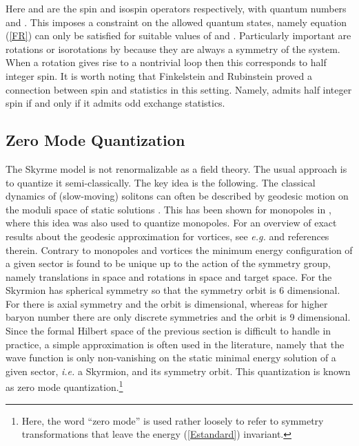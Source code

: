 \documentclass[a4paper,12pt]{article}
\begin{document}
%
Here \coordHE{} and \coordHE{} are the spin and isospin operators 
respectively, with quantum numbers \coordHE{} and \coordHE{}.
This imposes a constraint on the allowed quantum states, namely 
equation (\ref{FR}) can only be satisfied for suitable values of 
\coordHE{} and \coordHE{}. 
Particularly important are 
rotations or isorotations by \myHighlight{$2 \pi$}\coordHE{} because they are always a 
symmetry of the system. When a \myHighlight{$2 \pi$}\coordHE{} rotation gives rise to a 
nontrivial loop then this corresponds to half integer spin.
%
It is worth noting that Finkelstein and Rubinstein 
proved a connection between spin and statistics in this setting. 
Namely, \coordHE{} admits half integer spin if and only if it admits odd 
exchange statistics.

\subsection{Zero Mode Quantization}
\label{Zero-mode}


The Skyrme model is not renormalizable as a field theory. The usual 
approach is to quantize it semi-classically. The key idea is the 
following. The classical dynamics of (slow-moving) solitons can often be 
described by geodesic motion on the moduli space of static solutions 
\cite{Manton:1982mp}. This has 
been shown for monopoles in \cite{Gibbons:1986df}, where this idea 
was also used to quantize monopoles. For an overview of exact results 
about the geodesic approximation for vortices, see {\it e.g.} 
\cite{Manton:2002wb} and references therein. 
Contrary to monopoles and vortices the minimum energy configuration of a
given sector is found to be unique up to the action of the symmetry
group, namely translations in space and rotations 
in space and target space. For \coordHE{} the Skyrmion has spherical 
symmetry so that the symmetry orbit is 6 dimensional. For \coordHE{} there is 
axial symmetry and the orbit is \coordHE{} dimensional, whereas for higher 
baryon number there are only discrete symmetries and the orbit is 9 
dimensional. 
Since the formal Hilbert space \coordHE{} of the previous section is 
difficult to handle in practice,  a simple approximation 
is often used in the literature, namely that the 
wave function is only non-vanishing on the static minimal energy solution
of a given sector, {\it i.e.} a Skyrmion, and its symmetry orbit.
This quantization is known as zero mode 
quantization.\footnote{Here, the word ``zero mode'' is used rather loosely 
to refer to symmetry transformations that leave the energy 
(\ref{Estandard}) invariant.}
\end{document}
